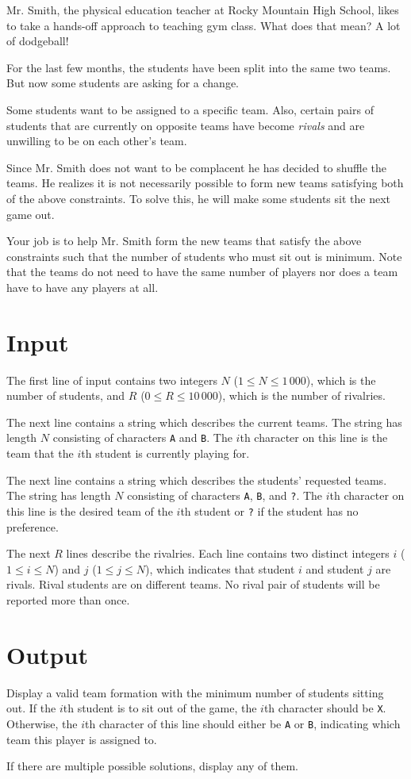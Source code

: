 
Mr. Smith, the physical education teacher at Rocky Mountain High School,
likes to take a hands-off approach to teaching gym class. What does that
mean? A lot of dodgeball!

For the last few months, the students have been split into the same two
teams. But now some students are asking for a change.

Some students want to be assigned to a specific team. Also, certain pairs
of students that are currently on opposite teams have become \textit{rivals} and
are unwilling to be on each other's team.

Since Mr. Smith does not want to be complacent he has decided to shuffle
the teams. He realizes it is not necessarily possible to form new teams
satisfying both of the above constraints. To solve this, he will make some
students sit the next game out.

Your job is to help Mr. Smith form the new teams that satisfy the above
constraints such that the number of students who must sit out is minimum.
Note that the teams do not need to have the same number of players nor
does a team have to have any players at all.

\section*{Input}
The first line of input contains two integers $N$ ($1 \leq N \leq 1\,000$),
which is the number of students, and $R$ ($0 \leq R \leq 10\,000$), which is
the number of rivalries.

The next line contains a string which describes the current teams. The string
has length $N$ consisting of characters \texttt{A} and \texttt{B}. The $i$th
character on this line is the team that the $i$th student is currently playing for.

The next line contains a string which describes the students' requested teams.
The string has length $N$ consisting of characters \texttt{A}, \texttt{B}, and
\texttt{?}. The $i$th character on this line is the desired team of the $i$th
student or \texttt{?} if the student has no preference.

The next $R$ lines describe the rivalries. Each line contains two distinct
integers $i$ ($1 \leq i \leq N$) and $j$ ($1 \leq j \leq N$), which indicates that
student $i$ and student $j$ are rivals. Rival students are on different teams.
No rival pair of students will be reported more than once.

\section*{Output}
Display a valid team formation with the minimum number of students sitting out.
If the $i$th student is to sit out of the game, the $i$th character should be
\texttt{X}. Otherwise, the $i$th character of this line should either be \texttt{A}
or \texttt{B}, indicating which team this player is assigned to.

If there are multiple possible solutions, display any of them.
